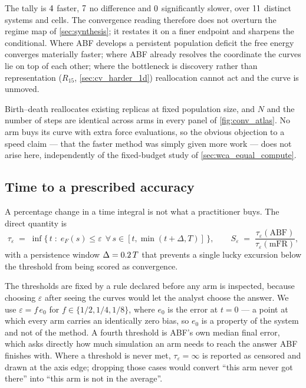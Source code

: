 The tally is $4$ faster, $7$ no difference and $0$ significantly
slower, over $11$ distinct systems and cells. The convergence reading therefore does
not overturn the regime map of \cref{sec:synthesis}; it restates it on a finer endpoint and
sharpens the conditional. Where ABF develops a persistent population deficit the free energy
converges materially faster; where ABF already resolves the coordinate the curves lie on top
of each other; where the bottleneck is discovery rather than representation
($R_{15}$, \cref{sec:cv_harder_1d}) reallocation cannot act and the curve is unmoved.

\begin{remark}
Birth--death reallocates existing replicas at fixed population size, and $N$ and the number of
steps are identical across arms in every panel of \cref{fig:conv_atlas}. No arm buys its curve
with extra force evaluations, so the obvious objection to a speed claim --- that the faster
method was simply given more work --- does not arise here, independently of the fixed-budget
study of \cref{sec:wca_equal_compute}.
\end{remark}

\subsection{Time to a prescribed accuracy}
\label{sec:conv_tau}

A percentage change in a time integral is not what a practitioner buys. The direct quantity is
\begin{equation}
  \tau_\varepsilon \;=\; \inf\Big\{\, t \;:\; e_F(s)\le\varepsilon
     \ \ \forall\, s\in[t,\min(t+\Delta,T)] \,\Big\},
  \qquad
  S_\varepsilon \;=\; \frac{\tau_\varepsilon(\mathrm{ABF})}{\tau_\varepsilon(\mathrm{mFR})},
  \label{eq:conv_tau}
\end{equation}
with a persistence window $\Delta = 0.2\,T$ that prevents a single lucky excursion
below the threshold from being scored as convergence.

The thresholds are fixed by a rule declared before any arm is inspected, because choosing
$\varepsilon$ after seeing the curves would let the analyst choose the answer. We use
$\varepsilon = f\,e_0$ for $f\in\{1/2,1/4,1/8\}$, where $e_0$ is the error at $t=0$ --- a point
at which every arm carries an identically zero bias, so $e_0$ is a property of the system and
not of the method. A fourth threshold is ABF's own median final error, which asks directly how
much simulation an arm needs to reach the answer ABF finishes with. Where a threshold is never
met, $\tau_\varepsilon=\infty$ is reported as censored and drawn at the axis edge; dropping
those cases would convert ``this arm never got there'' into ``this arm is not in the average''.

